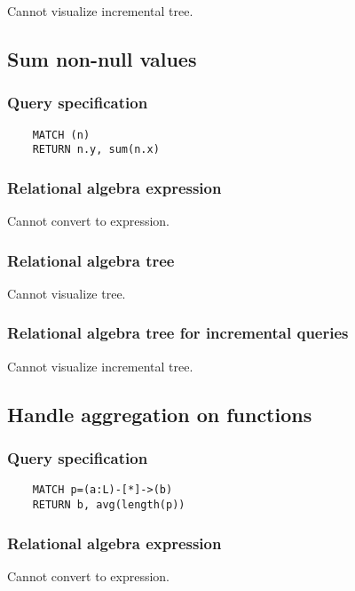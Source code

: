 	Cannot visualize incremental tree.
	\subsection{Sum non-null values}

	\subsubsection*{Query specification}

	\begin{lstlisting}
	MATCH (n)
	RETURN n.y, sum(n.x)
	\end{lstlisting}


	\subsubsection*{Relational algebra expression}

	Cannot convert to expression.

	\subsubsection*{Relational algebra tree}

	Cannot visualize tree.

	\subsubsection*{Relational algebra tree for incremental queries}

	Cannot visualize incremental tree.
	\subsection{Handle aggregation on functions}

	\subsubsection*{Query specification}

	\begin{lstlisting}
	MATCH p=(a:L)-[*]->(b)
	RETURN b, avg(length(p))
	\end{lstlisting}


	\subsubsection*{Relational algebra expression}

	Cannot convert to expression.

